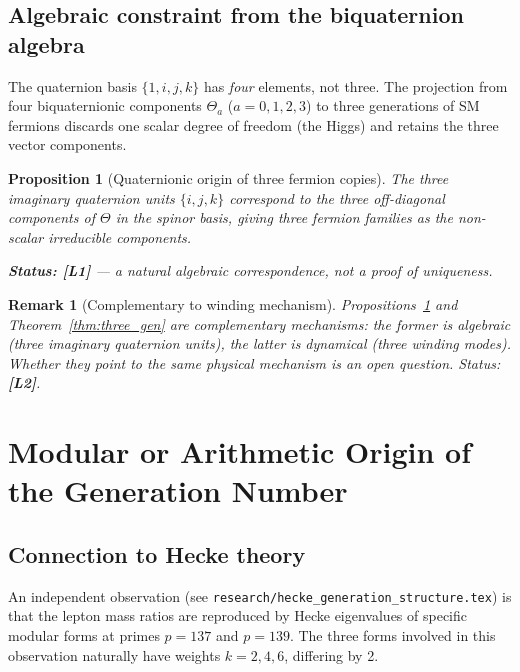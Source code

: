 \documentclass[11pt,a4paper]{article}
\newtheorem{proposition}{Proposition}
\newtheorem{remark}{Remark}
\begin{document}
\subsection{Algebraic constraint from the biquaternion algebra}

The quaternion basis $\{1, i, j, k\}$ has \emph{four} elements, not three.
The projection from four biquaternionic components $\Theta_a$ ($a = 0,1,2,3$)
to three generations of SM fermions discards one scalar degree of freedom
(the Higgs) and retains the three vector components.

\begin{proposition}[Quaternionic origin of three fermion copies]\label{prop:quat_3}
  The three imaginary quaternion units $\{i, j, k\}$ correspond to the
  three off-diagonal components of $\Theta$ in the spinor basis, giving
  three fermion families as the non-scalar irreducible components.

  \textbf{Status: [L1]} — a natural algebraic correspondence, not a proof
  of uniqueness.
\end{proposition}

\begin{remark}[Complementary to winding mechanism]
  Propositions~\ref{prop:quat_3} and Theorem~\ref{thm:three_gen} are
  \emph{complementary} mechanisms: the former is algebraic (three
  imaginary quaternion units), the latter is dynamical (three winding modes).
  Whether they point to the same physical mechanism is an open question.
  Status: \textbf{[L2]}.
\end{remark}

\section{Modular or Arithmetic Origin of the Generation Number}
\label{sec:modular_arithmetic}

\subsection{Connection to Hecke theory}

An independent observation (see \texttt{research/hecke\_generation\_structure.tex})
is that the lepton mass ratios are reproduced by Hecke eigenvalues of
specific modular forms at primes $p = 137$ and $p = 139$.  The three forms
involved in this observation naturally have weights $k = 2, 4, 6$, differing
by 2.
\end{document}
